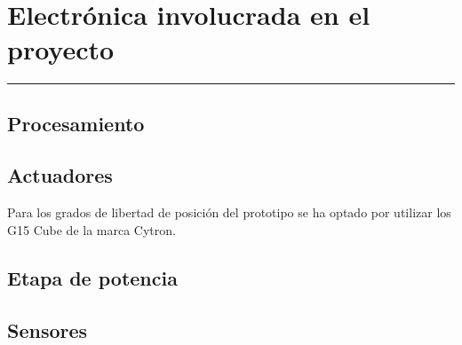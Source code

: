 \chapter{Electrónica involucrada en el proyecto} \label{chap:Electronica}
\hrule
\vspace{3mm}

\section{Procesamiento}

\section{Actuadores} \label{sec:Electronica:Actuadores}
\label{sec:Electronica:Actuadores:G15}

    Para los grados de libertad de posición del prototipo se ha optado por utilizar los  G15 Cube de la marca Cytron.

\section{Etapa de potencia} \label{sec:Electronica:Potencia}

\section{Sensores} \label{sec:Electronica:Sensores}



